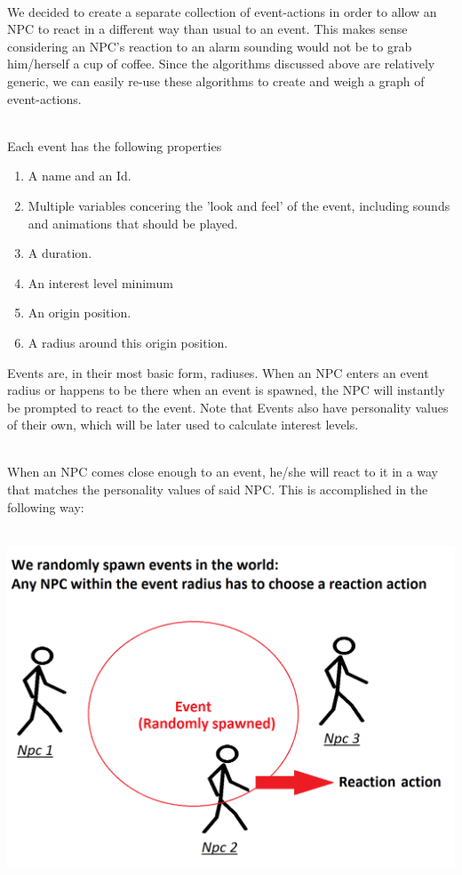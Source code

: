 \documentclass[11pt]{article} %
\begin{document}
~\\
We decided to create a separate collection of event-actions in order to allow an NPC to react in a different way than usual to an event. This makes sense considering an NPC's reaction to an alarm sounding would not be to grab him/herself a cup of coffee.
Since the algorithms discussed above are relatively generic, we can easily re-use these algorithms to create and weigh a graph of event-actions. 

~\\
Each event has the following properties 

\begin{enumerate}
\item A name and an Id.
\item Multiple variables concering the 'look and feel' of the event, including sounds and animations that should be played.
\item A duration.
\item An interest level minimum
\item An origin position.
\item A radius around this origin position.
\end{enumerate}

\newpage
Events are, in their most basic form, radiuses. When an NPC enters an event radius or happens to be there when an event is spawned, the NPC will instantly be prompted to react to the event.
Note that Events also have personality values of their own, which will be later used to calculate interest levels.

~\\
When an NPC comes close enough to an event, he/she will react to it in a way that matches the personality values of said NPC. This is accomplished in the following way:

~\\
\includegraphics[scale=0.4]{Event}
\end{document}
